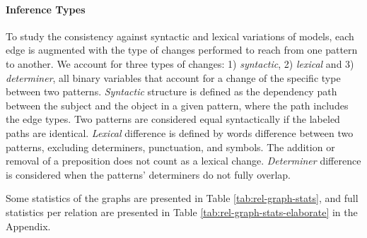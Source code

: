 \paragraph{Inference Types}
 
To study the consistency against syntactic and lexical variations of models, each edge is augmented with the type of changes performed to reach from one pattern to another. We account for three types of changes: 1) \textit{syntactic}, 2) \textit{lexical} and 3) \textit{determiner}, all binary variables that account for a change of the specific type between two patterns.
\textit{Syntactic} structure is defined as the dependency path between the subject and the object in a given pattern, where the path includes the edge types. Two patterns are considered equal syntactically if the labeled paths are identical.
\textit{Lexical} difference is defined by words difference between two patterns, excluding determiners, punctuation, and symbols. The addition or removal of a preposition does not count as a lexical change.
\textit{Determiner} difference is considered when the patterns' determiners do not fully overlap.


Some statistics of the graphs are presented in Table \ref{tab:rel-graph-stats}, and full statistics per relation are presented in Table \ref{tab:rel-graph-stats-elaborate} in the Appendix.





